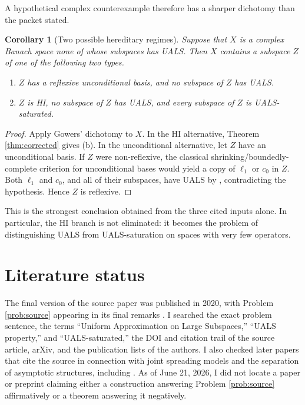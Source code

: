 \documentclass[11pt]{article}
\newtheorem{corollary}[theorem]{Corollary}
\theoremstyle{definition}
\theoremstyle{remark}
\begin{document}
A hypothetical complex counterexample therefore has a sharper dichotomy than the packet stated.

\begin{corollary}[Two possible hereditary regimes]\label{cor:two-regimes}
Suppose that $X$ is a complex Banach space none of whose subspaces has UALS.  Then $X$ contains a subspace $Z$ of one of the following two types.
\begin{enumerate}[label=(\alph*),leftmargin=2.2em]
\item $Z$ has a reflexive unconditional basis, and no subspace of $Z$ has UALS.
\item $Z$ is HI, no subspace of $Z$ has UALS, and every subspace of $Z$ is UALS-saturated.
\end{enumerate}
\end{corollary}

\begin{proof}
Apply Gowers' dichotomy to $X$.  In the HI alternative, Theorem \ref{thm:corrected} gives (b).  In the unconditional alternative, let $Z$ have an unconditional basis.  If $Z$ were non-reflexive, the classical shrinking/boundedly-complete criterion for unconditional bases would yield a copy of $\ell_1$ or $c_0$ in $Z$.  Both $\ell_1$ and $c_0$, and all of their subspaces, have UALS by \cite[Corollary 5.13]{AGLM}, contradicting the hypothesis.  Hence $Z$ is reflexive.
\end{proof}

This is the strongest conclusion obtained from the three cited inputs alone.  In particular, the HI branch is not eliminated: it becomes the problem of distinguishing UALS from UALS-saturation on spaces with very few operators.

\section{Literature status}

The final version of the source paper was published in 2020, with Problem \ref{prob:source} appearing in its final remarks \cite{AGLM}.  I searched the exact problem sentence, the terms ``Uniform Approximation on Large Subspaces,'' ``UALS property,'' and ``UALS-saturated,'' the DOI and citation trail of the source article, arXiv, and the publication lists of the authors.  I also checked later papers that cite the source in connection with joint spreading models and the separation of asymptotic structures, including \cite{AM,AGM,AMS,GMS}.  As of June 21, 2026, I did not locate a paper or preprint claiming either a construction answering Problem \ref{prob:source} affirmatively or a theorem answering it negatively.
\end{document}
